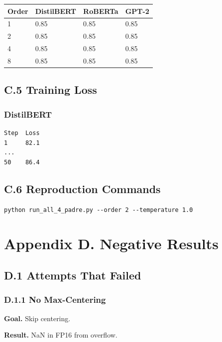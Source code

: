 \begin{table}[H]
\centering
\small
\begin{tabular}{llll}
\toprule
\textbf{Order} & \textbf{DistilBERT} & \textbf{RoBERTa} & \textbf{GPT-2} \\
\midrule
1 & 0.85 & 0.85 & 0.85 \\
2 & 0.85 & 0.85 & 0.85 \\
4 & 0.85 & 0.85 & 0.85 \\
8 & 0.85 & 0.85 & 0.85 \\
\bottomrule
\end{tabular}
\end{table}

\subsection{C.5 Training Loss}

\subsubsection{DistilBERT}
\begin{lstlisting}
Step  Loss
1     82.1
...
50    86.4
\end{lstlisting}

\subsection{C.6 Reproduction Commands}

\begin{lstlisting}
python run_all_4_padre.py --order 2 --temperature 1.0
\end{lstlisting}



\section{Appendix D. Negative Results}

\subsection{D.1 Attempts That Failed}

\subsubsection{D.1.1 No Max-Centering}

\textbf{Goal.} Skip centering.

\textbf{Result.} NaN in FP16 from overflow.

